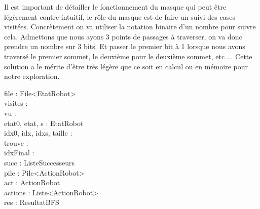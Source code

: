 Il est important de détailler le fonctionnement du masque qui peut être légèrement contre-intuitif, le rôle du masque est de faire un suivi des cases visitées. Concrètement on va utiliser la notation binaire d'un nombre pour suivre cela. Admettons que nous ayons 3 points de passages à traverser, on va donc prendre un nombre sur 3 bits. Et passer le premier bit à 1 lorsque nous avons traversé le premier sommet, le deuxième pour le deuxième sommet, etc ... Cette solution a le mérite d'être très légère que ce soit en calcul ou en mémoire pour notre exploration.

\vspace{0.5cm}
\begin{algorithme}

{file : File<EtatRobot> \\
 visites :  \\
 vu :  \\
 etat0, etat, s : EtatRobot \\
 idx0, idx, idxs, taille : \entier \\
 trouve : \booleen \\
 idxFinal : \entier \\
 succ : ListeSuccesseurs \\
 pile : Pile<ActionRobot> \\
 act : ActionRobot \\
 actions : Liste<ActionRobot> \\
 res : ResultatBFS}
{


\vspace{0.5cm}


}
\end{algorithme}
